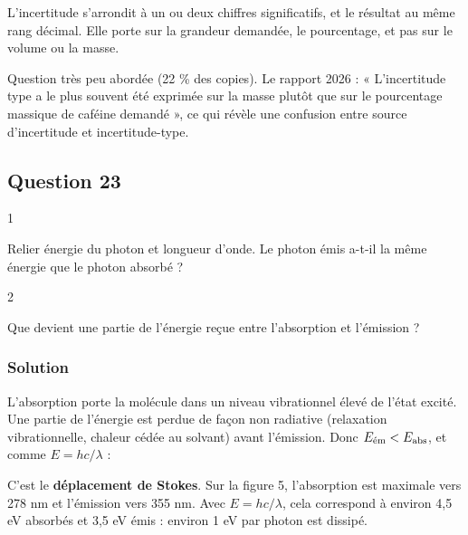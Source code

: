 \documentclass[11pt,a4paper]{article}
\newcommand{\equationajustee}[1]{%
  \sbox{\boiteequation}{$\displaystyle #1$}%
  \ifdim\wd\boiteequation>\linewidth
    \[\resizebox{\linewidth}{!}{\usebox{\boiteequation}}\]%
  \else
    \[#1\]%
  \fi}
\begin{document}
\begin{piege}

L'incertitude s'arrondit à un ou deux chiffres significatifs, et le résultat au même rang décimal. Elle porte sur la grandeur demandée, le pourcentage, et pas sur le volume ou la masse.

\end{piege}

\begin{jury}

Question très peu abordée (22 \% des copies). Le rapport 2026 : « L'incertitude type a le plus souvent été exprimée sur la masse plutôt que sur le pourcentage massique de caféine demandé », ce qui révèle une confusion entre source d'incertitude et incertitude-type.

\end{jury}

\hypertarget{question-23}{%
\subsection{Question 23}\label{question-23}}

\begin{indication}{1}

Relier énergie du photon et longueur d'onde. Le photon émis a-t-il la même énergie que le photon absorbé ?

\end{indication}

\begin{indication}{2}

Que devient une partie de l'énergie reçue entre l'absorption et l'émission ?

\end{indication}

\hypertarget{solution-22}{%
\subsubsection{Solution}\label{solution-22}}

L'absorption porte la molécule dans un niveau vibrationnel élevé de l'état excité. Une partie de l'énergie est perdue de façon non radiative (relaxation vibrationnelle, chaleur cédée au solvant) avant l'émission. Donc \(E_{\rm \text{ém}} < E_{\rm abs}\), et comme \(E = hc/\lambda\) :

\equationajustee{\boxed{\lambda_{\rm \text{ém}} > \lambda_{\rm abs}}}

C'est le \textbf{déplacement de Stokes}. Sur la figure 5, l'absorption est maximale vers 278 nm et l'émission vers 355 nm. Avec \(E = hc/\lambda\), cela correspond à environ 4,5 eV absorbés et 3,5 eV émis : environ 1 eV par photon est dissipé.
\end{document}
